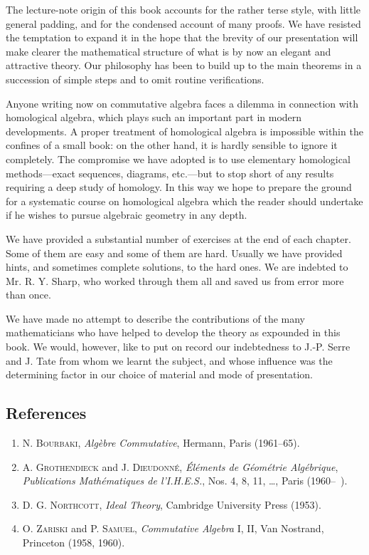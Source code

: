 The lecture-note origin of this book accounts for the rather terse style, with little general padding, and for the condensed account of many proofs. We have resisted the temptation to expand it in the hope that the brevity of our presentation will make clearer the mathematical structure of what is by now an elegant and attractive theory. Our philosophy has been to build up to the main theorems in a succession of simple steps and to omit routine verifications.

Anyone writing now on commutative algebra faces a dilemma in connection with homological algebra, which plays such an important part in modern developments. A proper treatment of homological algebra is impossible within the confines of a small book: on the other hand, it is hardly sensible to ignore it completely. The compromise we have adopted is to use elementary homological methods---exact sequences, diagrams, etc.---but to stop short of any results requiring a deep study of homology. In this way we hope to prepare the ground for a systematic course on homological algebra which the reader should undertake if he wishes to pursue algebraic geometry in any depth.

We have provided a substantial number of exercises at the end of each chapter. Some of them are easy and some of them are hard. Usually we have provided hints, and sometimes complete solutions, to the hard ones. We are indebted to Mr. R. Y. Sharp, who worked through them all and saved us from error more than once.

We have made no attempt to describe the contributions of the many mathematicians who have helped to develop the theory as expounded in this book. We would, however, like to put on record our indebtedness to J.-P. Serre and J. Tate from whom we learnt the subject, and whose influence was the determining factor in our choice of material and mode of presentation.

\subsection*{References}

\begin{enumerate}
\item{} N. \textsc{Bourbaki}, \emph{Alg\`ebre Commutative}, Hermann, Paris (1961--65).
\item{} A. \textsc{Grothendieck} and J. \textsc{Dieudonn\'e}, \emph{\'El\'ements de G\'eom\'etrie Alg\'ebrique}, \emph{Publications Math\'ematiques de l'I.H.E.S.}, Nos. 4, 8, 11, \ldots, Paris (1960--\ ).
\item{} D. G. \textsc{Northcott}, \emph{Ideal Theory}, Cambridge University Press (1953).
\item{} O. \textsc{Zariski} and P. \textsc{Samuel}, \emph{Commutative Algebra} I, II, Van Nostrand, Princeton (1958, 1960).
\end{enumerate}

